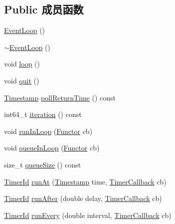 \subsection*{Public 成员函数}
\begin{DoxyCompactItemize}
\item 
\hyperlink{classmuduo_1_1net_1_1EventLoop_a2bb4ef53c2b77f2313fe0db9fc952450}{Event\+Loop} ()
\item 
\hyperlink{classmuduo_1_1net_1_1EventLoop_ad39d140230e71b90198d0ed03e0c21f2}{$\sim$\+Event\+Loop} ()
\item 
void \hyperlink{classmuduo_1_1net_1_1EventLoop_afe461d27b9c48d5921c00d521181f12f}{loop} ()
\item 
void \hyperlink{classmuduo_1_1net_1_1EventLoop_a2463a3acef2df4c951ce942a3229e44e}{quit} ()
\item 
\hyperlink{classmuduo_1_1Timestamp}{Timestamp} \hyperlink{classmuduo_1_1net_1_1EventLoop_a5c4a9a6cf52fc408cdd33c8445fb5127}{poll\+Return\+Time} () const
\item 
int64\+\_\+t \hyperlink{classmuduo_1_1net_1_1EventLoop_a1cee21cf429a898323eb98258939a4dc}{iteration} () const
\item 
void \hyperlink{classmuduo_1_1net_1_1EventLoop_a85ed7594d67ceea00ae641d1dddb80d8}{run\+In\+Loop} (\hyperlink{classmuduo_1_1net_1_1EventLoop_a322d335989ca5098875638110aafba84}{Functor} cb)
\item 
void \hyperlink{classmuduo_1_1net_1_1EventLoop_a82dadba8c4b9a3efafdc78c5c21f85df}{queue\+In\+Loop} (\hyperlink{classmuduo_1_1net_1_1EventLoop_a322d335989ca5098875638110aafba84}{Functor} cb)
\item 
size\+\_\+t \hyperlink{classmuduo_1_1net_1_1EventLoop_a0eff42734d64323acbd2e676bcd27b76}{queue\+Size} () const
\item 
\hyperlink{classmuduo_1_1net_1_1TimerId}{Timer\+Id} \hyperlink{classmuduo_1_1net_1_1EventLoop_a4350dc8459b380bdd4341f3d91b69348}{run\+At} (\hyperlink{classmuduo_1_1Timestamp}{Timestamp} time, \hyperlink{namespacemuduo_1_1net_ad4bd8788fd4c609b90c78920572bec50}{Timer\+Callback} cb)
\item 
\hyperlink{classmuduo_1_1net_1_1TimerId}{Timer\+Id} \hyperlink{classmuduo_1_1net_1_1EventLoop_af7e9c28bac049d58cc6a8e5040e1ddb2}{run\+After} (double delay, \hyperlink{namespacemuduo_1_1net_ad4bd8788fd4c609b90c78920572bec50}{Timer\+Callback} cb)
\item 
\hyperlink{classmuduo_1_1net_1_1TimerId}{Timer\+Id} \hyperlink{classmuduo_1_1net_1_1EventLoop_a356b0d632f1ffd8e4d352c78e30af891}{run\+Every} (double interval, \hyperlink{namespacemuduo_1_1net_ad4bd8788fd4c609b90c78920572bec50}{Timer\+Callback} cb)

\end{DoxyCompactItemize}
